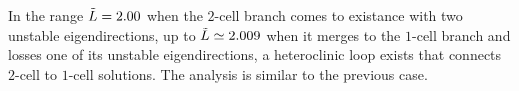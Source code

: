 In the range $\tilde{L}=2.00$ when the $2$-cell branch comes to existance with two unstable eigendirections, up to $\tilde{L} \simeq 2.009$ when it
merges to the $1$-cell branch and losses one of its unstable eigendirections, a heteroclinic loop exists that connects $2$-cell to $1$-cell solutions.
The analysis is similar to the previous case.

